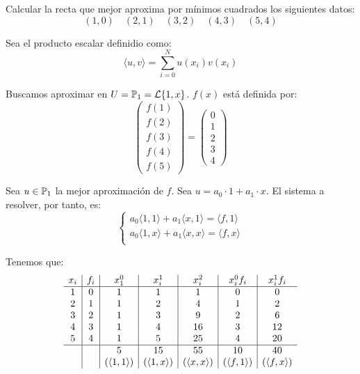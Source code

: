 \begin{ejemplo}
    Calcular la recta que mejor aproxima por mínimos cuadrados los siguientes datos:
    \begin{equation*}
        (1,0) \quad (2,1) \quad (3,2) \quad (4,3) \quad (5,4)
    \end{equation*}

    Sea el producto escalar definidio como:
    \begin{equation*}
        \langle u,v\rangle = \sum_{i=0}^N u(x_i)v(x_i)
    \end{equation*}

    Buscamos aproximar en $U=\mathbb{P}_1=\mathcal{L}\{1,x\}$. $f(x)$ está definida por:
    \begin{equation*}
        \left(\begin{array}{c}
            f(1) \\ f(2) \\ f(3) \\ f(4) \\ f(5)
        \end{array}\right)
        = \left(\begin{array}{c}
            0 \\ 1 \\ 2 \\ 3 \\ 4
        \end{array}\right)
    \end{equation*}

    Sea $u \in \mathbb{P}_1$ la mejor aproximación de $f$. Sea $u=a_0 \cdot 1 + a_1\cdot x$. El sistema a resolver, por tanto, es:
    \begin{equation*}
        \left\{\begin{array}{c}
            a_0\langle 1,1\rangle + a_1 \langle x,1\rangle = \langle f, 1 \rangle \\
            a_0\langle 1,x\rangle + a_1 \langle x,x\rangle = \langle f, x \rangle \\
        \end{array}\right.
    \end{equation*}

    Tenemos que:
    \begin{equation*}
        \begin{array}{c|c|c|c|c|c|c}
            x_i & f_i & x_1^0 & x_i^1 & x_i^2 & x_i^0f_i & x_i^1f_i \\ \hline
            1 & 0 & 1 & 1 & 1 & 0 & 0 \\
            2 & 1 & 1 & 2 & 4 & 1 & 2 \\
            3 & 2 & 1 & 3 & 9 & 2 & 6 \\
            4 & 3 & 1 & 4 & 16 & 3 & 12 \\
            5 & 4 & 1 & 5 & 25 & 4 & 20 \\ \hline
            && 5 & 15 & 55 & 10 & 40 \\
            && (\langle 1,1 \rangle) & (\langle 1,x \rangle) &
            (\langle x,x \rangle) & 
            (\langle f,1 \rangle) &
            (\langle f,x \rangle)
            

\end{array}
\end{equation*}
\end{ejemplo}
